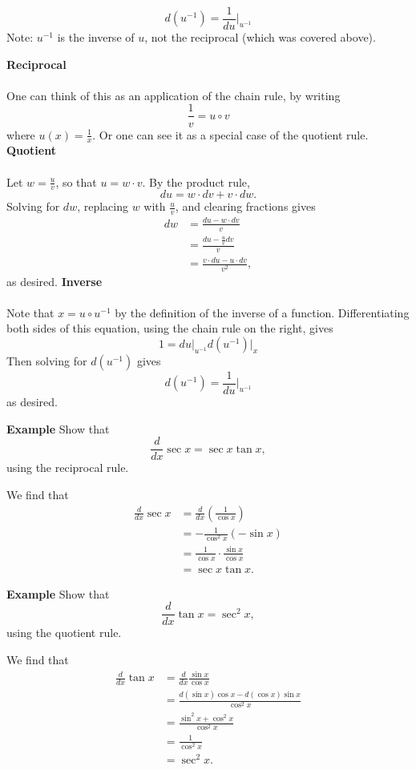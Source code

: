 \documentclass[twoside,openright,titlepage,a4paper]{book}
\begin{document}
\begin{sloppypar}
\[ d (u^{-1} ) = \frac{1}{du} \bigg|_{u^{-1}} \] 
Note: $u^{-1}$ is the inverse of $u$, not the reciprocal (which was covered above).

\begin{examplebox}
\textbf{Reciprocal}\\\\
One can think of this as an application of the chain rule, by writing \[ \frac{1}{v} = u \circ v \] where $u(x) = \frac{1}{x}$. Or one can see it as a special case of the quotient rule.
\bigbreak
\textbf{Quotient}\\\\
Let $w = \frac{u}{v}$, so that $u = w \cdot v$. By the product rule, \[ du = w \cdot dv + v \cdot dw. \]
Solving for $dw$, replacing $w$ with $\frac{u}{v}$, and clearing fractions gives
\begin{align*}
dw &= \frac{du - w \cdot dv}{v} \\
&= \frac{du - \frac{u}{v} dv}{v} \\
&= \frac{v \cdot du - u \cdot dv}{v^2},
\end{align*}
as desired.
\bigbreak
\textbf{Inverse}\\\\
Note that $x = u \circ u^{-1}$ by the definition of the inverse of a function. Differentiating both sides of this equation, using the chain rule on the right, gives \[ 1 = du \bigg|_{u^{-1}} d(u^{-1}) \bigg|_{x} \]
Then solving for $d(u^{-1})$ gives \[ d(u^{-1}) = \frac{1}{du} \bigg|_{u^{-1}} \] as desired.
\end{examplebox}

\textbf{Example} Show that \[ \frac{d}{dx} \sec x = \sec x \tan x, \] using the reciprocal rule.
\begin{examplebox}
We find that
\begin{align*}
\frac{d}{dx} \sec x &= \frac{d}{dx}\left(\frac{1}{\cos x}\right) \\
&= -\frac{1}{\cos^2x} (-\sin x) \\
&= \frac{1}{\cos x} \cdot \frac{\sin x}{\cos x} \\
&= \sec x \tan x.
\end{align*}
\end{examplebox}

\textbf{Example} Show that \[ \frac{d}{dx} \tan x = \sec^2 x, \] using the quotient rule. 
\begin{examplebox}
We find that
\begin{align*}
\frac{d}{dx}\tan x &= \frac{d}{dx} \frac{\sin x}{\cos x} \\
&= \frac{d(\sin x)\cos x - d(\cos x)\sin x}{\cos^2 x} \\
&= \frac{\sin^2x + \cos^2x}{\cos^2x} \\
&= \frac{1}{\cos^2x} \\
&= \sec^2 x. 
\end{align*}
\end{examplebox}


\end{sloppypar}
\end{document}
